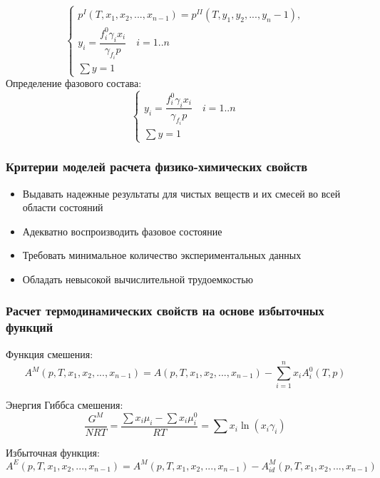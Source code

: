\begin{frame}

	\begin{equation}
	\left\lbrace 
	\begin{gathered} 
	p^{I}(T,x_1,x_2,...,x_{n-1})=p^{II}(T,y_1,y_2,...,y_n-1),\\
	y_i=\dfrac{ f_i^0 \gamma_i x_i } { \gamma_{f_i} p  } \quad i=1..n \\
	\sum y =1
	\end{gathered} 
	\right.
	\end{equation}
Определение фазового состава:	
	\begin{equation}
	\left\lbrace 
	\begin{gathered} 
	y_i=\dfrac{ f_i^0 \gamma_i x_i } { \gamma_{f_i} p  } \quad i=1..n \\
	\sum y =1
	\end{gathered} 
	\right.
	\end{equation}
\end{frame}

\begin{frame}
	\frametitle{Критерии моделей расчета физико-химических свойств}
	\begin{itemize}
		\item Выдавать надежные результаты для чистых веществ и их смесей во всей области состояний
		\item Адекватно воспроизводить фазовое состояние
		\item Требовать минимальное количество экспериментальных данных
		\item Обладать невысокой вычислительной трудоемкостью
	\end{itemize}
\end{frame}


\begin{frame}
	\frametitle{Расчет термодинамических свойств на основе избыточных функций}
	Функция смешения:
	\begin{equation}
		A^M ( p, T, x_1 , x_2 , ... , x_{n-1} )=A( p,T, x_1 , x_2 , ... , x_{n-1} )- \sum_{i=1}^n x_i A_i^0 ( T,p )
	\end{equation}
		
	Энергия Гиббса смешения:
	\begin{equation}
		\dfrac{G^M} {NRT} = \dfrac{ \sum x_i \mu_i -\sum x_i \mu_i^0 } { RT} = \sum x_i \ln( x_i \gamma_i )
	\end{equation}
	
	
	Избыточная функция:
	\begin{equation}
		A^E ( p, T, x_1 , x_2 , ... , x_{n-1} )=A^M( p,T, x_1 , x_2 , ... , x_{n-1} )- A^M_{id}( p,T, x_1 , x_2 , ... , x_{n-1} )
	\end{equation}
	
\end{frame}

